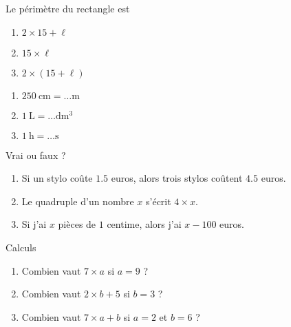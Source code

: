 

\begin{MentalActivity}
    \begin{mental}

        \begin{center}
            
        \end{center}
        
        Le périmètre du rectangle est
        \begin{enumerate}
            \item
                \( 2\times 15+\ell\)
            \item
                \( 15\times \ell\)
            \item
                \( 2\times (15+\ell)\)
        \end{enumerate}

    \end{mental}

    \begin{mental}
        \begin{enumerate}
            \item
                $\SI{250}{\centi\meter}=\ldots\si{\meter}$
            \item
                $\SI{1}{\liter}=\ldots\si{\deci\cubic\meter}$
            \item
                \( \SI{1}{\hour}=\ldots\si{\second}\)
        \end{enumerate}
    \end{mental}

    \begin{mental}
        Vrai ou faux ?
        \begin{enumerate}
            \item
                Si un stylo coûte \( 1.5\) euros, alors trois stylos coûtent \( 4.5\) euros.
            \item
                Le quadruple d'un nombre \( x\) s'écrit \( 4\times x\).
            \item
                Si j'ai \( x\) pièces de \( 1\) centime, alors j'ai \( x-100\) euros.
        \end{enumerate}
    \end{mental}

    \begin{mental}
        Calculs 
        \begin{enumerate}
            \item
                Combien vaut \( 7\times a\) si \( a=9\) ?
            \item
                Combien vaut \( 2\times b+5\) si \( b=3\) ?
            \item
                Combien vaut \( 7\times a+b\) si \( a=2\) et \( b=6\) ?
        \end{enumerate}
    \end{mental}
\end{MentalActivity}

